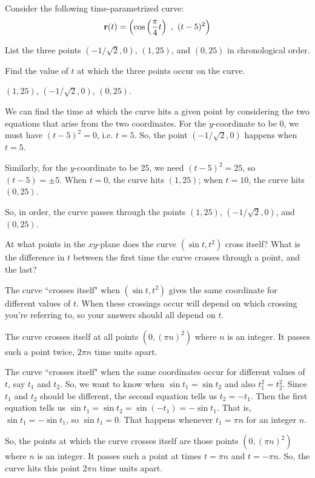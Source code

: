 \begin{question}
Consider the following time-parametrized curve:
\[\mathbf{r}(t)=\left( \cos\left(\frac{\pi}{4}t\right)~,~(t-5)^2\right)\]

List the three points $(-1/\sqrt{2},0)$, $(1,25)$, and $(0,25)$ in chronological order.
\end{question}
\begin{hint}
Find the value of $t$ at which the three points occur on the curve.
\end{hint}
\begin{answer}
$(1,25)$, $(-1/\sqrt2,0)$, $(0,25)$.
\end{answer}
\begin{solution}
We can find the time at which the curve hits a given point by considering the two equations that arise from the two coordinates. For the $y$-coordinate to be 0, we must have $(t-5)^2=0$, i.e. $t=5$. So, the point $(-1/\sqrt{2},0)$ happens when $t=5$.

Similarly, for the $y$-coordinate to be $25$,  we need $(t-5)^2=25$, so $(t-5)=\pm 5$.
When $t=0$, the curve hits $(1, 25)$; when $t=10$, the curve hits $(0,25)$.

So, in order, the curve passes through the points $(1,25)$, $(-1/\sqrt2,0)$, and $(0,25)$.
\end{solution}
\begin{question}
At what points in the $xy$-plane does the curve $(\sin t, t^2)$ cross itself? What is the difference in $t$ between the first time the curve crosses through a point, and the last?
\end{question}
\begin{hint}
The curve ``crosses itself" when $(\sin t,t^2)$ gives the same coordinate for different values of $t$. When these crossings occur will depend on which crossing you're referring to, so your answers should all depend on $t$.
\end{hint}
\begin{answer}
The curve crosses itself at all points $(0,(\pi n)^2)$ where $n$ is an integer. It passes such a point twice, $2\pi n$ time units apart.
\end{answer}
\begin{solution}
The curve ``crosses itself" when the same coordinates occur for different values of $t$, say $t_1$ and $t_2$. So, we want to know when $\sin t_1=\sin t_2$ and also $t_1^2=t_2^2$. Since $t_1$ and $t_2$ should be different, the second equation tells us $t_2=-t_1$. Then the first equation tells us $\sin t_1=\sin t_2=\sin(-t_1)=-\sin t_1$. That is, $\sin t_1 = -\sin t_1$, so $\sin t_1=0$. That happens whenever $t_1=\pi n$ for an integer $n$.

So, the points at which the curve crosses itself are those points $(0,(\pi n)^2)$ where $n$ is an integer. It passes such a point at times $t=\pi n $ and $t=-\pi n$. So, the curve hits this point $2\pi n$ time units apart.
\end{solution}
